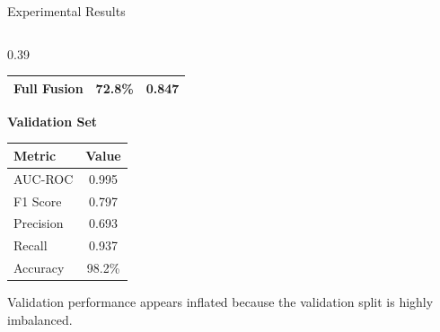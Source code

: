 \documentclass[aspectratio=169, 10pt]{beamer}
\begin{document}
\begin{frame}{Experimental Results}
\begin{columns}[T,onlytextwidth]
\begin{column}{0.39\textwidth}
\begin{tabular}{@{}lcc@{}}
\rowcolor{CardGreen}
\bfseries Full Fusion &
\bfseries 72.8\% &
\bfseries 0.847 \\

\bottomrule

\end{tabular}

\vspace{4pt}

\textcolor{NavyBlue}{\small\bfseries Validation Set}

\vspace{2pt}

\scriptsize

\begin{tabular}{@{}lc@{}}

\toprule

\rowcolor{NavyBlue}
\color{white}\small Metric &
\color{white}\small Value \\

\midrule

\rowcolor{CardBlue}
AUC-ROC & 0.995 \\

F1 Score & 0.797 \\

\rowcolor{CardBlue}
Precision & 0.693 \\

Recall & 0.937 \\

\rowcolor{CardBlue}
Accuracy & 98.2\% \\

\bottomrule

\end{tabular}

\vspace{3pt}

\begin{tcolorbox}[
orangecard,
boxsep=1pt,
left=2pt,right=2pt,
top=2pt,bottom=2pt]

\footnotesize
Validation performance appears inflated because the validation split is highly imbalanced.

\end{tcolorbox}

\end{column}

\end{columns}

\end{frame}
\end{document}
